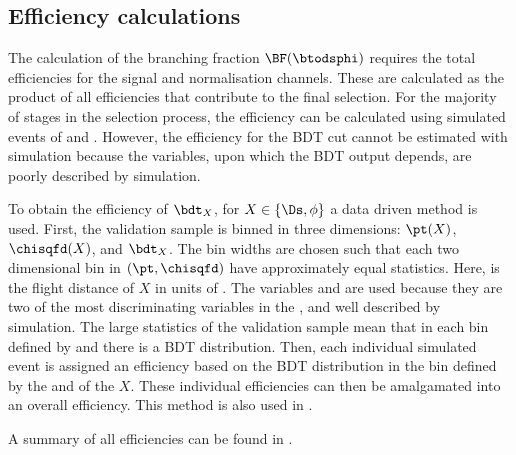 \subsection{Efficiency calculations}
The calculation of the branching fraction $\BF(\btodsphi)$ requires the total efficiencies for the
signal and normalisation channels.
These are calculated as the product of all efficiencies that contribute to the final selection.
For the majority of stages in the selection process, the efficiency can be calculated using
simulated events of \btodsphi and \btodsd.
However, the efficiency for the BDT cut cannot be estimated with simulation because the \pid
variables, upon which the BDT output depends, are poorly described by simulation.



To obtain the efficiency of $\bdt_{X}$, for $X\in\{\Ds,\phi\}$ a data driven method is used.
First, the validation sample is
binned in three dimensions: $\pt(X)$, $\chisqfd(X)$, and $\bdt_{X}$.
The bin widths are chosen such that each two dimensional bin in $(\pt,\chisqfd)$ have approximately
equal statistics.
Here, \chisqfd is the flight distance of $X$ in units of \chisq.
The variables \pt and \chisqfd are used because they are two of the most discriminating variables
in the \bdt, and well described by simulation.
The large statistics of the validation sample mean that in each bin defined by \pt and \chisqfd
there is a BDT distribution.
Then, each individual simulated event is assigned an efficiency based on the BDT distribution in
the bin defined by the \pt and \chisqfd of the $X$.
These individual efficiencies can then be amalgamated into an overall efficiency.
This method is also used in .

A summary of all efficiencies can be found in .


